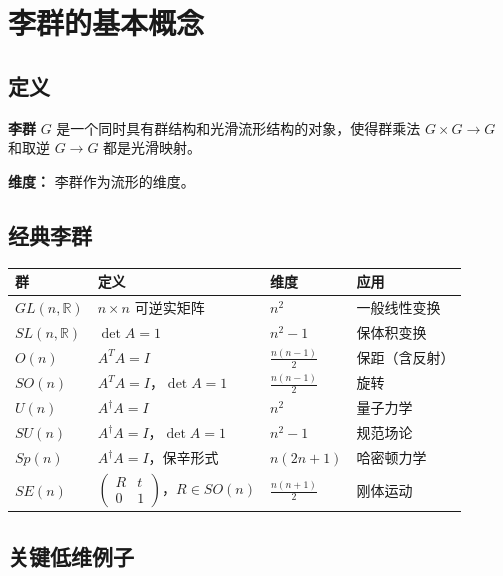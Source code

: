 \section{李群的基本概念}
\label{sec:lie-group}

\subsection{定义}

\textbf{李群} $G$ 是一个同时具有群结构和光滑流形结构的对象，使得群乘法 $G \times G \to G$ 和取逆 $G \to G$ 都是光滑映射。

\textbf{维度：} 李群作为流形的维度。

\subsection{经典李群}

\begin{center}
\begin{tabular}{L{2cm}L{5cm}L{1.5cm}L{4cm}}
\toprule
\textbf{群} & \textbf{定义} & \textbf{维度} & \textbf{应用} \\
\midrule
$GL(n,\mathbb{R})$ & $n\times n$ 可逆实矩阵 & $n^2$ & 一般线性变换 \\
$SL(n,\mathbb{R})$ & $\det A = 1$ & $n^2 - 1$ & 保体积变换 \\
$O(n)$ & $A^TA = I$ & $\frac{n(n-1)}{2}$ & 保距（含反射） \\
$SO(n)$ & $A^TA = I$，$\det A = 1$ & $\frac{n(n-1)}{2}$ & 旋转 \\
$U(n)$ & $A^\dagger A = I$ & $n^2$ & 量子力学 \\
$SU(n)$ & $A^\dagger A = I$，$\det A = 1$ & $n^2 - 1$ & 规范场论 \\
$Sp(n)$ & $A^\dagger A = I$，保辛形式 & $n(2n+1)$ & 哈密顿力学 \\
$SE(n)$ & $\begin{pmatrix} R & t \\ 0 & 1 \end{pmatrix}$，$R \in SO(n)$ & $\frac{n(n+1)}{2}$ & 刚体运动 \\
\bottomrule
\end{tabular}
\end{center}

\subsection{关键低维例子}

